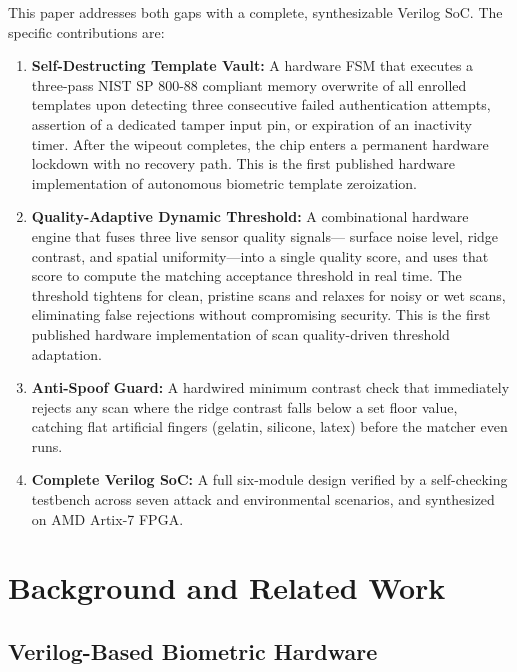\documentclass[conference]{IEEEtran}
\begin{document}
This paper addresses both gaps with a complete, synthesizable
Verilog SoC. The specific contributions are:

\begin{enumerate}
    \item \textbf{Self-Destructing Template Vault:} A hardware FSM
    that executes a three-pass NIST SP 800-88 compliant memory
    overwrite of all enrolled templates upon detecting three
    consecutive failed authentication attempts, assertion of a
    dedicated tamper input pin, or expiration of an inactivity timer.
    After the wipeout completes, the chip enters a permanent hardware
    lockdown with no recovery path. This is the first published
    hardware implementation of autonomous biometric template
    zeroization.

    \item \textbf{Quality-Adaptive Dynamic Threshold:} A combinational
    hardware engine that fuses three live sensor quality signals---
    surface noise level, ridge contrast, and spatial uniformity---into
    a single quality score, and uses that score to compute the
    matching acceptance threshold in real time. The threshold tightens
    for clean, pristine scans and relaxes for noisy or wet scans,
    eliminating false rejections without compromising security. This is
    the first published hardware implementation of scan quality-driven
    threshold adaptation.

    \item \textbf{Anti-Spoof Guard:} A hardwired minimum contrast
    check that immediately rejects any scan where the ridge contrast
    falls below a set floor value, catching flat artificial fingers
    (gelatin, silicone, latex) before the matcher even runs.

    \item \textbf{Complete Verilog SoC:} A full six-module design
    verified by a self-checking testbench across seven attack and
    environmental scenarios, and synthesized on AMD Artix-7 FPGA.
\end{enumerate}

\section{Background and Related Work}

\subsection{Verilog-Based Biometric Hardware}
\end{document}
